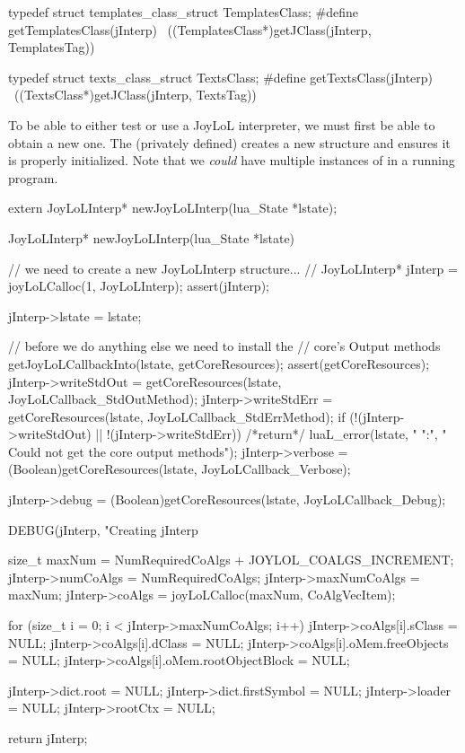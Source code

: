 typedef struct templates_class_struct TemplatesClass;
#define getTemplatesClass(jInterp)                          \
  ((TemplatesClass*)getJClass(jInterp, TemplatesTag))

typedef struct texts_class_struct TextsClass;
#define getTextsClass(jInterp)                              \
  ((TextsClass*)getJClass(jInterp, TextsTag))
\stopCHeader

\startTestSuite[newJoyLoLInterp]

To be able to either test or use a JoyLoL interpreter, we must first be 
able to obtain a new one. The (privately defined)  
creates a new  structure and ensures it is properly 
initialized. Note that we \emph{could} have multiple instances of 
\type{JoyLoLInterp} in a running program. 

\startCHeader
extern JoyLoLInterp* newJoyLoLInterp(lua_State *lstate);
\stopCHeader
\setCHeaderStream{public}

\startCCode
JoyLoLInterp* newJoyLoLInterp(lua_State *lstate) {
  // we need to create a new JoyLoLInterp structure...
  //
  JoyLoLInterp* jInterp = joyLoLCalloc(1, JoyLoLInterp);
  assert(jInterp);

  jInterp->lstate = lstate;
  
  // before we do anything else we need to install the
  // core's Output methods
  getJoyLoLCallbackInto(lstate, getCoreResources);
  assert(getCoreResources);
  jInterp->writeStdOut =
    getCoreResources(lstate, JoyLoLCallback_StdOutMethod);
  jInterp->writeStdErr =
    getCoreResources(lstate, JoyLoLCallback_StdErrMethod);
  if (!(jInterp->writeStdOut) || !(jInterp->writeStdErr)) {
    /*return*/ luaL_error(lstate, "%
      "\nERROR:\n",
      "  Could not get the core output methods\n");
  }
  jInterp->verbose = 
    (Boolean)getCoreResources(lstate, JoyLoLCallback_Verbose);
    
  jInterp->debug = 
    (Boolean)getCoreResources(lstate, JoyLoLCallback_Debug);

  DEBUG(jInterp, "Creating jInterp %
    
  size_t maxNum =
    NumRequiredCoAlgs + JOYLOL_COALGS_INCREMENT;
  jInterp->numCoAlgs    = NumRequiredCoAlgs;
  jInterp->maxNumCoAlgs = maxNum;
  jInterp->coAlgs    = joyLoLCalloc(maxNum, CoAlgVecItem);
  
  for (size_t i = 0; i < jInterp->maxNumCoAlgs; i++) {
    jInterp->coAlgs[i].sClass               = NULL;
    jInterp->coAlgs[i].dClass               = NULL;
    jInterp->coAlgs[i].oMem.freeObjects     = NULL;
    jInterp->coAlgs[i].oMem.rootObjectBlock = NULL; 
  }
  
  jInterp->dict.root        = NULL;
  jInterp->dict.firstSymbol = NULL;
  jInterp->loader           = NULL;
  jInterp->rootCtx          = NULL;
    
  return jInterp;
}
\stopCCode

